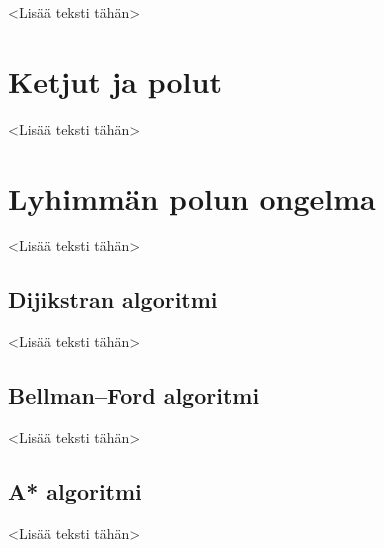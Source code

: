 <Lisää teksti tähän>

\section{Ketjut ja polut}

<Lisää teksti tähän>

\section{Lyhimmän polun ongelma}

<Lisää teksti tähän>

  \subsection{Dijikstran algoritmi}

  <Lisää teksti tähän>

  \subsection{Bellman–Ford algoritmi}

  <Lisää teksti tähän>

  \subsection{A* algoritmi}

  <Lisää teksti tähän>
